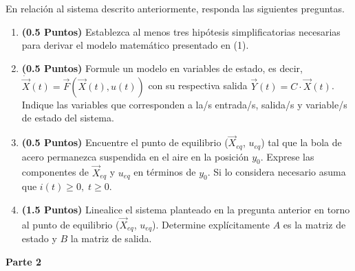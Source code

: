 
 En relación al sistema descrito anteriormente, responda las siguientes preguntas.
\begin{enumerate}
    \item \textbf{(0.5 Puntos)} Establezca al menos tres hipótesis simplificatorias necesarias para derivar el modelo matemático presentado en (1).
    \item \textbf{(0.5 Puntos)} Formule un modelo en variables de estado, es decir, $\dot{\Vec{X}}(t)=\Vec{F}(\Vec{X}(t), u(t))$
    con su respectiva salida $\Vec{Y}(t) = C\cdot\Vec{X}(t)$. Indique las variables que corresponden a la/s entrada/s, salida/s y variable/s de estado del sistema. 
    \item \textbf{(0.5 Puntos)} Encuentre el punto de equilibrio ($\Vec{X}_{eq}$, $u_{eq}$)   tal que la bola de acero permanezca suspendida en el aire en la posición $y_0$. Exprese las componentes de $\Vec{X}_{eq}$ y $u_{eq}$ en términos de $y_0$. Si lo considera necesario asuma que $i(t)\geq 0,\; t\geq 0$.
    \item \textbf{(1.5 Puntos)} Linealice el sistema planteado en la pregunta anterior en torno al punto de equilibrio ($\Vec{X}_{eq}$, $u_{eq}$). Determine explícitamente $A$ es la matriz de estado y $B$ la matriz de salida.
    
    

\end{enumerate}

\textbf{Parte 2}

